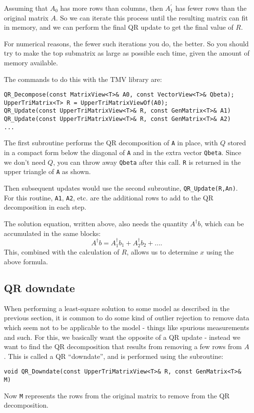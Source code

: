 \documentclass[twoside,letterpaper,11pt]{article}
\renewcommand{\tt}[1]{{\texttt {#1}}}
\begin{document}
Assuming that $A_0$ has more rows than columns, 
then $A_1^\prime$ has fewer rows than
the original matrix $A$.  So we can iterate this process until the 
resulting matrix can fit in memory, and we can perform the final QR update
to get the final value of $R$.

For numerical reasons, 
the fewer such iterations you do, the better.  So you should try to make the 
top submatrix as large as possible each time, given the amount of memory
available.

The commands to do this with the TMV library are:
\begin{verbatim}
QR_Decompose(const MatrixView<T>& A0, const VectorView<T>& Qbeta);
UpperTriMatrix<T> R = UpperTriMatrixViewOf(A0);
QR_Update(const UpperTriMatrixView<T>& R, const GenMatrix<T>& A1)
QR_Update(const UpperTriMatrixView<T>& R, const GenMatrix<T>& A2)
...
\end{verbatim}

The first subroutine performs the QR decomposition of \tt{A} in place, with $Q$ 
stored in a compact form below the diagonal of \tt{A} and in the extra
vector \tt{Qbeta}.  Since we don't need $Q$, you can throw away
\tt{Qbeta} after this call.  \tt{R} is returned in the upper triangle of \tt{A}
as shown.

Then subsequent updates would use the second subroutine, \tt{QR\_Update(R,An)}.
For this routine, \tt{A1}, \tt{A2}, etc. are the additional rows to 
add to the QR decomposition in each step.  

The solution equation, written above, also needs the quantity $A^\dagger b$, which
can be accumulated in the same blocks:
\begin{equation}
A^\dagger b = A_1^\dagger b_1 + A_2^\dagger b_2 + ....
\end{equation}
This, combined with the calculation of $R$, allows us to determine $x$ using the above formula.

\subsection{QR downdate}
\label{downdate}

When performing a least-square solution to some model as described in the 
previous section, 
it is common to do some kind of outlier rejection to remove data which
seem not to be applicable to the model - things like spurious measurements
and such.
For this, we basically want the opposite of a QR update - instead we want to 
find the QR decomposition that results from
removing a few rows from $A$.  This is called a QR ``downdate'', and is performed
using the subroutine:
\begin{verbatim}
void QR_Downdate(const UpperTriMatrixView<T>& R, const GenMatrix<T>& M)
\end{verbatim}
Now \tt{M} represents the rows from the original matrix to remove from the 
QR decomposition.
\end{document}
